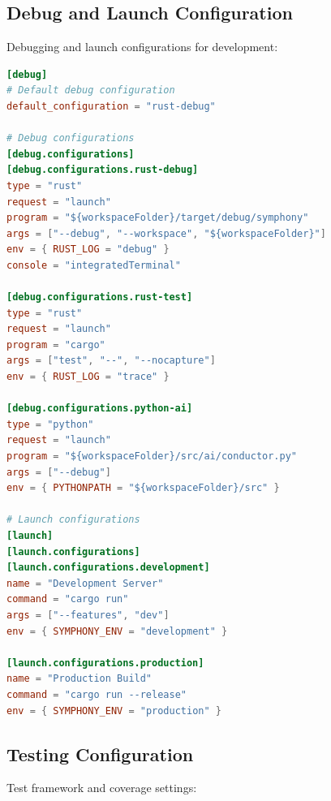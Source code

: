\subsection*{Debug and Launch Configuration}

Debugging and launch configurations for development:

\begin{lstlisting}[language=toml,caption={Debug Configuration}]
[debug]
# Default debug configuration
default_configuration = "rust-debug"

# Debug configurations
[debug.configurations]
[debug.configurations.rust-debug]
type = "rust"
request = "launch"
program = "${workspaceFolder}/target/debug/symphony"
args = ["--debug", "--workspace", "${workspaceFolder}"]
env = { RUST_LOG = "debug" }
console = "integratedTerminal"

[debug.configurations.rust-test]
type = "rust"
request = "launch"
program = "cargo"
args = ["test", "--", "--nocapture"]
env = { RUST_LOG = "trace" }

[debug.configurations.python-ai]
type = "python"
request = "launch"
program = "${workspaceFolder}/src/ai/conductor.py"
args = ["--debug"]
env = { PYTHONPATH = "${workspaceFolder}/src" }

# Launch configurations
[launch]
[launch.configurations]
[launch.configurations.development]
name = "Development Server"
command = "cargo run"
args = ["--features", "dev"]
env = { SYMPHONY_ENV = "development" }

[launch.configurations.production]
name = "Production Build"
command = "cargo run --release"
env = { SYMPHONY_ENV = "production" }
\end{lstlisting}

\subsection*{Testing Configuration}

Test framework and coverage settings:

